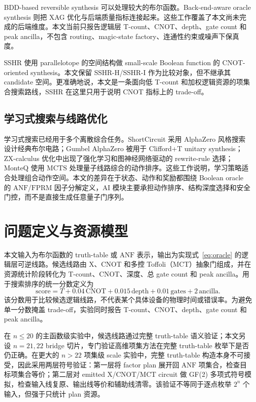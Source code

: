 \documentclass[UTF8,fontset=macnew,11pt]{ctexart}
\newcommand{\anf}{\ensuremath{\mathrm{ANF}}}
\newcommand{\fprm}{\ensuremath{\mathrm{FPRM}}}
\newcommand{\mcts}{\ensuremath{\mathrm{MCTS}}}
\newcommand{\score}{\ensuremath{\mathrm{score}}}
\newcommand{\ttable}{truth-table}
\begin{document}
BDD-based reversible synthesis 可以处理较大的布尔函数\cite{wille2009bdd}。Back-end-aware oracle synthesis 则把 XAG 优化与后端质量指标连接起来\cite{yu2025backend}。这些工作覆盖了本文尚未完成的后端维度。本文当前只报告逻辑层 T-count、CNOT、depth、gate count 和 peak ancilla，不包含 routing、magic-state factory、连通性约束或噪声下保真度。

SSHR 使用 parallelotope 的空间结构做 small-scale Boolean function 的 CNOT-oriented synthesis\cite{zheng2025sshr}。本文保留 SSHR-H/SSHR-I 作为比较对象，但不继承其 candidate 空间。更准确地说，本文是一条面向低 T-count 和加权逻辑资源的项集合搜索路线，SSHR 在这里只用于说明 CNOT 指标上的 trade-off。

\subsection{学习式搜索与线路优化}

学习式搜索已经用于多个离散综合任务。ShortCircuit 采用 AlphaZero 风格搜索设计经典布尔电路\cite{tsaras2024shortcircuit}；Gumbel AlphaZero 被用于 Clifford+T unitary synthesis\cite{rietsch2024unitary}；ZX-calculus 优化中出现了强化学习和图神经网络驱动的 rewrite-rule 选择\cite{riu2025rlzx}；MonteQ 使用 \mcts{} 处理量子线路综合的动作排序\cite{machiya2026monteq}。这些工作说明，学习策略适合处理组合动作空间。本文的差异在于状态、动作和奖励都围绕 Boolean oracle 的 \anf{}/\fprm{} 因子分解定义，AI 模块主要承担动作排序、结构深度选择和安全门控，而不是直接生成任意量子门序列。

\section{问题定义与资源模型}

本文输入为布尔函数的 \ttable{} 或 \anf{} 表示，输出为实现式~\eqref{eq:oracle} 的逻辑层可逆线路。候选线路由 X、CNOT 和多控 Toffoli（MCT）抽象门组成，并在资源统计阶段转化为 T-count、CNOT、深度、总 gate count 和 peak ancilla。用于搜索排序的统一分数定义为
\begin{equation}
  \score = T + 0.04\,\mathrm{CNOT} + 0.015\,\mathrm{depth}
         + 0.01\,\mathrm{gates} + 2\,\mathrm{ancilla}.
  \label{eq:score}
\end{equation}
该分数用于比较候选逻辑线路，不代表某个具体设备的物理时间或错误率。为避免单一分数掩盖 trade-off，实验同时报告 T-count、CNOT、depth、gate count 和 peak ancilla。

在 $n\leq20$ 的主函数级实验中，候选线路通过完整 \ttable{} 语义验证；本文另设 $n=21,22$ bridge 切片，专门验证高维项集方法在完整 \ttable{} 枚举下是否仍正确。在更大的 $n>22$ 项集级 scale 实验中，完整 \ttable{} 构造本身不可接受，因此采用两层符号验证：第一层将 factor plan 展开回 \anf{} 项集合，检查目标项集合等价；第二层对 emitted X/CNOT/MCT circuit 做 GF(2) 多项式符号模拟，检查输入线复原、输出线等价和辅助线清零。该验证不等同于逐点枚举 $2^n$ 个输入，但强于只统计 plan 资源。
\end{document}
